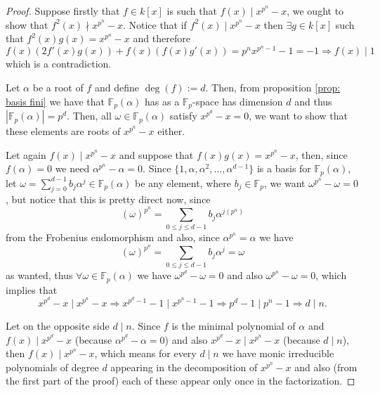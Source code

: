 \begin{proof}
    Suppose firstly that \(f \in k[x]\) is such that \(f(x) \mid x^{p^n} - x\),
    we ought to show that \(f^2(x) \nmid x^{p^n} - x\). Notice that if  \(f^2(x)
    \mid x^{p^n} - x\) then  \(\exists g \in k[x]\) such that \(f^2(x)g(x) =
    x^{p^n} - x\) and therefore
    \[
        f(x)\left( 2f'(x)g(x)\right) + f(x) \left( f(x) g'(x) \right) = p^n
        x^{p^n - 1} - 1 = -1 \Rightarrow f(x) \mid 1
    \]
    which is a contradiction.

    Let \(\alpha\) be a root of \(f\) and define \(\deg(f) := d\). Then, from
    proposition \ref{prop: basis fini} we have that \(\mathbb{F}_p(\alpha)\) has
    as a \(\mathbb{F}_p\)-space has dimension \(d\) and thus
    \(|\mathbb{F}_p(\alpha)| = p^d\). Then, all \(\omega \in
    \mathbb{F}_p(\alpha)\) satisfy \(x^{p^d} - x = 0\), we want to show that
    these elements are roots of \(x^{p^n} - x\) either.

    Let again \(f(x) \mid x^{p^n} - x\) and suppose that  \(f(x)g(x) = x^{p^n} -
    x\), then, since \(f(\alpha) = 0\) we need \(\alpha^{p^n} - \alpha = 0\).
    Since \(\{1, \alpha, \alpha^2, \dots, \alpha^{d-1}\}\) is a basis for
    \(\mathbb{F}_p(\alpha)\), let \(\omega = \sum_{j=0}^{d-1} b_j \alpha^j \in
    \mathbb{F}_p(\alpha)\) be any element, where \(b_j \in \mathbb{F}_p\), we
    want \(\omega^{p^n} - \omega = 0\), but notice that this is pretty direct
    now, since
    \[
        (\omega)^{p^n} = \sum_{0 \leqslant j \leqslant d-1} b_j \alpha^{j(p^n)}
    \]
    from the Frobenius endomorphism and also, since \(\alpha^{p^n} = \alpha\) we
    have
    \[
        (\omega)^{p^n} = \sum_{0 \leqslant j \leqslant d-1} b_j \alpha^j = \omega
    \]
    as wanted, thus \(\forall \omega \in \mathbb{F}_p(\alpha)\) we have
    \(\omega^{p^d} - \omega = 0\) and also  \(\omega^{p^n} - \omega = 0\), which
    implies that
    \[
        x^{p^d} - x \mid x^{p^n} - x \Rightarrow x^{p^d - 1} - 1 \mid
        x^{p^n - 1} - 1 \Rightarrow p^d - 1 \mid p^n - 1
        \Rightarrow d \mid n.
    \]

    Let on the opposite side \(d \mid n\). Since \(f\) is the minimal polynomial
    of \(\alpha\) and \(f(x) \mid x^{p^d} - x\) (because \(\alpha^{p^d} -
    \alpha = 0\)) and also \(x^{p^d} - x \mid x^{p^n} - x\) (because \(d \mid
    n\)), then \(f(x) \mid x^{p^n} - x\), which means for every \(d \mid n\) we
    have monic irreducible polynomials of degree \(d\) appearing in the
    decomposition of \(x^{p^n} - x\) and also (from the first part of the proof)
    each of these appear only once in the factorization.
\end{proof}


